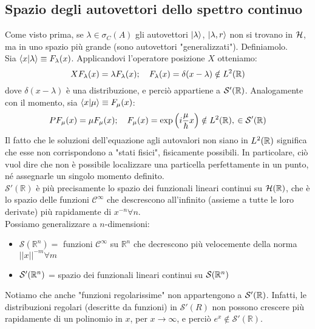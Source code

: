 \documentclass[12pt]{article}
\begin{document}
\subsection{Spazio degli autovettori dello spettro continuo}
Come visto prima, se $\lambda \in \sigma_C(A)$ gli autovettori $\ket{\lambda}$, $\ket{\lambda,r}$ non si trovano in $\mathcal{H}$, ma in uno spazio più grande (sono autovettori "generalizzati"). Definiamolo.\\
Sia $\braket{x|\lambda} \equiv F_\lambda(x)$. Applicandovi l'operatore posizione $X$ otteniamo:
\[
XF_\lambda(x) = \lambda F_\lambda(x); \quad F_\lambda(x) = \delta(x-\lambda) \notin L^2(\mathbb{R})
\]
dove $\delta(x-\lambda)$ è una distribuzione, e perciò appartiene a $\mathcal{S}'(\mathbb{R})$. Analogamente con il momento, sia $\braket{x|\mu}\equiv F_\mu(x)$:
\[
P F_\mu(x) = \mu F_\mu(x); \quad F_\mu(x) = \exp\left ( i\frac{\mu}{\hbar}x\right ) \notin L^2(\mathbb{R}),\> \in \mathcal{S}'(\mathbb{R})
\] %
Il fatto che le soluzioni dell'equazione agli autovalori non siano in $L^2(\mathbb{R})$ significa che esse non corrispondono a "stati fisici", fisicamente possibili. In particolare, ciò vuol dire che non è possibile localizzare una particella perfettamente in un punto, né assegnarle un singolo momento definito.\\
$\mathcal{S}'\left(\mathbb{R}\right)$ è più precisamente lo spazio dei funzionali lineari continui su $\mathcal{H}(\mathbb{R})$, che è lo spazio delle funzioni $\mathcal{C}^\infty$ che descrescono all'infinito (assieme a tutte le loro derivate) più rapidamente di $x^{-n} \forall n$.\\
Possiamo generalizzare a $n$-dimensioni:
\begin{itemize}
    \item $\mathcal{S}\left(\mathbb{R}^n\right)=$ funzioni $\mathcal{C}^\infty$ su $\mathbb{R}^n$ che decrescono più velocemente della norma $\left|\left|x\right|\right|^{-m} \forall m$
    \item $\mathcal{S}'(\mathbb{R}^n)$ = spazio dei funzionali lineari continui su $\mathcal{S}(\mathbb{R}^n)$
\end{itemize}
\begin{oss}
Notiamo che anche "funzioni regolarissime" non appartengono a $\mathcal{S}'(\mathbb{R})$. Infatti, le distribuzioni regolari (descritte da funzioni) in $\mathcal{S}'(R)$ non possono crescere più rapidamente  di un polinomio in $x$, per $x\rightarrow \infty$, e perciò $e^x\notin \mathcal{S}'\left(\mathbb{R}\right)$.
\end{oss}
\end{document}
